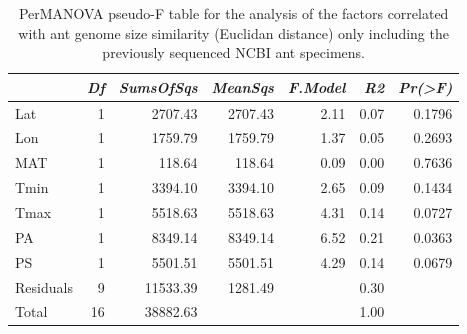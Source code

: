 \begin{table}[ht]
\centering
\begin{tabular}{lrrrrrr}
  \hline
 & {\emph{Df}} & {\emph{SumsOfSqs}} & {\emph{MeanSqs}} & {\emph{F.Model}} & {\emph{R2}} & {\emph{Pr(>F)}} \\ 
  \hline
Lat & 1 & 2707.43 & 2707.43 & 2.11 & 0.07 & 0.1796 \\ 
  Lon & 1 & 1759.79 & 1759.79 & 1.37 & 0.05 & 0.2693 \\ 
  MAT & 1 & 118.64 & 118.64 & 0.09 & 0.00 & 0.7636 \\ 
  Tmin & 1 & 3394.10 & 3394.10 & 2.65 & 0.09 & 0.1434 \\ 
  Tmax & 1 & 5518.63 & 5518.63 & 4.31 & 0.14 & 0.0727 \\ 
  PA & 1 & 8349.14 & 8349.14 & 6.52 & 0.21 & 0.0363 \\ 
  PS & 1 & 5501.51 & 5501.51 & 4.29 & 0.14 & 0.0679 \\ 
  Residuals & 9 & 11533.39 & 1281.49 &  & 0.30 &  \\ 
  Total & 16 & 38882.63 &  &  & 1.00 &  \\ 
   \hline
\end{tabular}
\caption{PerMANOVA pseudo-F table for the analysis of the factors 
correlated with ant genome size similarity (Euclidan distance) only including the 
previously sequenced NCBI ant specimens.} 
\label{tab:perm_size_napg}
\end{table}
